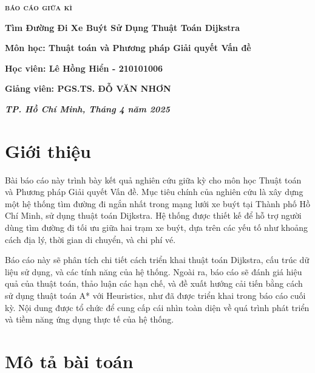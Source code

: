 \documentclass[a4paper,12pt]{article}
\begin{document}
\begin{titlepage}
\begin{center}
        {\bfseries\scshape\Large báo cáo giữa kì \par}
        \vspace{0.5cm}
        
        {\huge\bfseries Tìm Đường Đi Xe Buýt Sử Dụng Thuật Toán Dijkstra \par}
        \vspace{1cm}
        
        {\bfseries\large Môn học: Thuật toán và Phương pháp Giải quyết Vấn đề \par}
        \vspace{2cm}
        {\bfseries\large Học viên: Lê Hồng Hiển - 210101006 \par}
        \vspace{0.5cm}
        {\bfseries\large Giảng viên: PGS.TS. ĐỖ VĂN NHƠN \par}
        \vspace{4cm}
        {\bfseries\itshape\large TP. Hồ Chí Minh, Tháng 4 năm 2025 \par}
    \end{center}
    \restoregeometry
\end{titlepage}

\tableofcontents
\newpage

\section{Giới thiệu}
Bài báo cáo này trình bày kết quả nghiên cứu giữa kỳ cho môn học Thuật toán và Phương pháp Giải quyết Vấn đề. Mục tiêu chính của nghiên cứu là xây dựng một hệ thống tìm đường đi ngắn nhất trong mạng lưới xe buýt tại Thành phố Hồ Chí Minh, sử dụng thuật toán Dijkstra\cite{dijkstra1959}. Hệ thống được thiết kế để hỗ trợ người dùng tìm đường đi tối ưu giữa hai trạm xe buýt, dựa trên các yếu tố như khoảng cách địa lý, thời gian di chuyển, và chi phí vé. 

Báo cáo này sẽ phân tích chi tiết cách triển khai thuật toán Dijkstra\cite{dijkstra1959}, cấu trúc dữ liệu sử dụng, và các tính năng của hệ thống. Ngoài ra, báo cáo sẽ đánh giá hiệu quả của thuật toán, thảo luận các hạn chế, và đề xuất hướng cải tiến bằng cách sử dụng thuật toán A* với Heuristics\cite{hart1968}, như đã được triển khai trong báo cáo cuối kỳ. Nội dung được tổ chức để cung cấp cái nhìn toàn diện về quá trình phát triển và tiềm năng ứng dụng thực tế của hệ thống.

\section{Mô tả bài toán}
\end{document}
